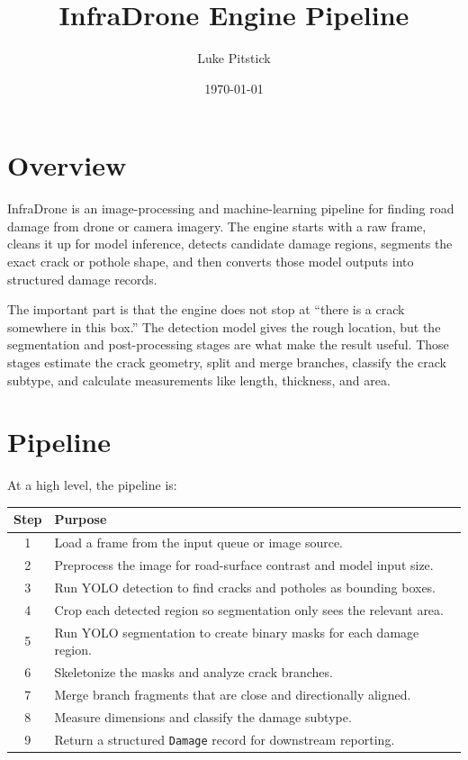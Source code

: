\documentclass[11pt]{article}
\title{\textbf{InfraDrone Engine Pipeline}}
\author{Luke Pitstick}
\date{\today}
\begin{document}
\maketitle

\section{Overview}

InfraDrone is an image-processing and machine-learning pipeline for finding road damage from drone or camera imagery. The engine starts with a raw frame, cleans it up for model inference, detects candidate damage regions, segments the exact crack or pothole shape, and then converts those model outputs into structured damage records.

The important part is that the engine does not stop at ``there is a crack somewhere in this box.'' The detection model gives the rough location, but the segmentation and post-processing stages are what make the result useful. Those stages estimate the crack geometry, split and merge branches, classify the crack subtype, and calculate measurements like length, thickness, and area.

\section{Pipeline}

At a high level, the pipeline is:

\begin{center}
\begin{tabular}{cl}
\toprule
\textbf{Step} & \textbf{Purpose} \\
\midrule
1 & Load a frame from the input queue or image source. \\
2 & Preprocess the image for road-surface contrast and model input size. \\
3 & Run YOLO detection to find cracks and potholes as bounding boxes. \\
4 & Crop each detected region so segmentation only sees the relevant area. \\
5 & Run YOLO segmentation to create binary masks for each damage region. \\
6 & Skeletonize the masks and analyze crack branches. \\
7 & Merge branch fragments that are close and directionally aligned. \\
8 & Measure dimensions and classify the damage subtype. \\
9 & Return a structured \texttt{Damage} record for downstream reporting. \\
\bottomrule
\end{tabular}
\end{center}
\end{document}
